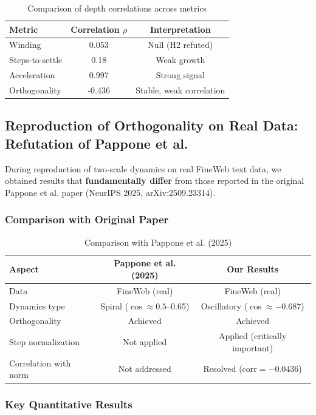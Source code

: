 \documentclass[12pt,a4paper]{article}
\begin{document}
\begin{table}[h]
\centering
\caption{Comparison of depth correlations across metrics}
\begin{tabular}{lcc}
\toprule
Metric & Correlation $\rho$ & Interpretation \\
\midrule
Winding & 0.053 & Null (H2 refuted) \\
Steps-to-settle & 0.18 & Weak growth \\
Acceleration & 0.997 & Strong signal \\
Orthogonality & -0.436 & Stable, weak correlation \\
\bottomrule
\end{tabular}
\end{table}

\subsection{Reproduction of Orthogonality on Real Data: Refutation of Pappone et al.}

During reproduction of two-scale dynamics on real FineWeb text data, we obtained results that \textbf{fundamentally differ} from those reported in the original Pappone et al. paper (NeurIPS 2025, arXiv:2509.23314).

\subsubsection{Comparison with Original Paper}

\begin{table}[h]
\centering
\caption{Comparison with Pappone et al. (2025)}
\begin{tabular}{lcc}
\toprule
Aspect & Pappone et al. (2025) & Our Results \\
\midrule
Data & FineWeb (real) & FineWeb (real) \\
Dynamics type & Spiral ($\cos \approx 0.5$--0.65) & Oscillatory ($\cos \approx -0.687$) \\
Orthogonality & Achieved & Achieved \\
Step normalization & Not applied & Applied (critically important) \\
Correlation with norm & Not addressed & Resolved ($\text{corr} = -0.0436$) \\
\bottomrule
\end{tabular}
\end{table}

\subsubsection{Key Quantitative Results}
\end{document}
